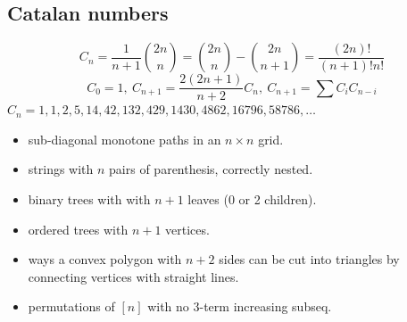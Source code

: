 \begin{compactmath}
\subsection{Catalan numbers} %
\[ C_n=\frac{1}{n+1}\binom{2n}{n}= \binom{2n}{n}-\binom{2n}{n+1} = \frac{(2n)!}{(n+1)!n!} \]
\[ C_0=1,\ C_{n+1} = \frac{2(2n+1)}{n+2}C_n,\ C_{n+1}=\sum C_iC_{n-i} \]
${C_n = 1, 1, 2, 5, 14, 42, 132, 429, 1430, 4862, 16796, 58786, \dots}$
\begin{itemize}[noitemsep]
	\item sub-diagonal monotone paths in an $n\times n$ grid.
	\item strings with $n$ pairs of parenthesis, correctly nested.
	\item binary trees with with $n+1$ leaves (0 or 2 children).
	\item ordered trees with $n+1$ vertices.
	\item ways a convex polygon with $n+2$ sides can be cut into triangles by connecting vertices with straight lines.
	\item permutations of $[n]$ with no 3-term increasing subseq.
\end{itemize}
\end{compactmath}
